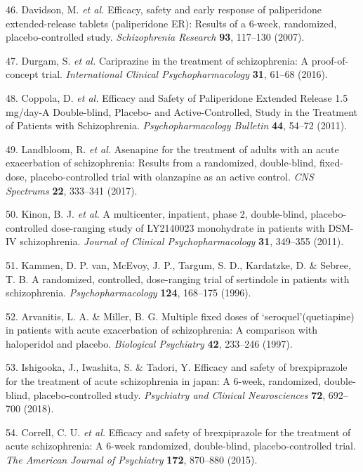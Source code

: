 \documentclass[9pt,english,,jou,floatsintext]{apa6}
\begin{document}
\hypertarget{ref-Davidson2007}{}
46. Davidson, M. \emph{et al.} Efficacy, safety and early response of
paliperidone extended-release tablets (paliperidone ER): Results of a
6-week, randomized, placebo-controlled study. \emph{Schizophrenia
Research} \textbf{93}, 117--130 (2007).

\hypertarget{ref-Durgam2016}{}
47. Durgam, S. \emph{et al.} Cariprazine in the treatment of
schizophrenia: A proof-of-concept trial. \emph{International Clinical
Psychopharmacology} \textbf{31}, 61--68 (2016).

\hypertarget{ref-Coppola2011}{}
48. Coppola, D. \emph{et al.} Efficacy and Safety of Paliperidone
Extended Release 1.5 mg/day-A Double-blind, Placebo- and
Active-Controlled, Study in the Treatment of Patients with
Schizophrenia. \emph{Psychopharmacology Bulletin} \textbf{44}, 54--72
(2011).

\hypertarget{ref-Landbloom2017}{}
49. Landbloom, R. \emph{et al.} Asenapine for the treatment of adults
with an acute exacerbation of schizophrenia: Results from a randomized,
double-blind, fixed-dose, placebo-controlled trial with olanzapine as an
active control. \emph{CNS Spectrums} \textbf{22}, 333--341 (2017).

\hypertarget{ref-Kinon2011}{}
50. Kinon, B. J. \emph{et al.} A multicenter, inpatient, phase 2,
double-blind, placebo-controlled dose-ranging study of LY2140023
monohydrate in patients with DSM-IV schizophrenia. \emph{Journal of
Clinical Psychopharmacology} \textbf{31}, 349--355 (2011).

\hypertarget{ref-VanKammen1996}{}
51. Kammen, D. P. van, McEvoy, J. P., Targum, S. D., Kardatzke, D. \&
Sebree, T. B. A randomized, controlled, dose-ranging trial of sertindole
in patients with schizophrenia. \emph{Psychopharmacology} \textbf{124},
168--175 (1996).

\hypertarget{ref-Arvanitis1997}{}
52. Arvanitis, L. A. \& Miller, B. G. Multiple fixed doses of
`seroquel'(quetiapine) in patients with acute exacerbation of
schizophrenia: A comparison with haloperidol and placebo.
\emph{Biological Psychiatry} \textbf{42}, 233--246 (1997).

\hypertarget{ref-Ishigooka2018}{}
53. Ishigooka, J., Iwashita, S. \& Tadori, Y. Efficacy and safety of
brexpiprazole for the treatment of acute schizophrenia in japan: A
6-week, randomized, double-blind, placebo-controlled study.
\emph{Psychiatry and Clinical Neurosciences} \textbf{72}, 692--700
(2018).

\hypertarget{ref-Correll2015}{}
54. Correll, C. U. \emph{et al.} Efficacy and safety of brexpiprazole
for the treatment of acute schizophrenia: A 6-week randomized,
double-blind, placebo-controlled trial. \emph{The American Journal of
Psychiatry} \textbf{172}, 870--880 (2015).
\end{document}
